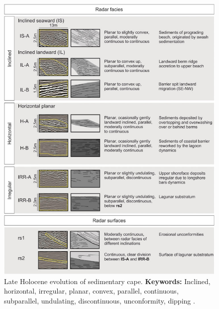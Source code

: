 \begin{figure}[h!]
    \centering
    \includegraphics[width=0.9\linewidth]{Figures/0.2GPR/Figueiredo2021-fx1.jpg}
    \caption[Late Holocene evolution of sedimentary cape.]{Late Holocene evolution of sedimentary cape. \textbf{Keywords: } Inclined, horizontal, irregular, planar, convex, parallel, continuous, subparallel, undulating, discontinuous, unconformity, dipping \citep{Figueiredo2021}.}
    \label{fig:Figueiredo2021-1}
\end{figure}
\clearpage
